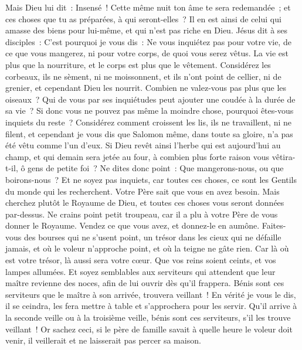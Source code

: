 \begin{multicols}{2}
Mais Dieu lui dit~: Insensé~! Cette même nuit ton âme te sera redemandée~; et ces choses que tu as préparées, à qui seront-elles~?
Il en est ainsi de celui qui amasse des biens pour lui-même, et qui n'est pas riche en Dieu.
Jésus dit à ses disciples~: C'est pourquoi je vous dis~: Ne vous inquiétez pas pour votre vie, de ce que vous mangerez, ni pour votre corps, de quoi vous serez vêtus.
La vie est plus que la nourriture, et le corps est plus que le vêtement.
Considérez les corbeaux, ils ne sèment, ni ne moissonnent, et ils n'ont point de cellier, ni de grenier, et cependant Dieu les nourrit. Combien ne valez-vous pas plus que les oiseaux~?
Qui de vous par ses inquiétudes peut ajouter une coudée à la durée de sa vie~?
Si donc vous ne pouvez pas même la moindre chose, pourquoi êtes-vous inquiets du reste~?
Considérez comment croissent les lis, ils ne travaillent, ni ne filent, et cependant je vous dis que Salomon même, dans toute sa gloire, n'a pas été vêtu comme l'un d'eux.
Si Dieu revêt ainsi l'herbe qui est aujourd'hui au champ, et qui demain sera jetée au four, à combien plus forte raison vous vêtira-t-il, ô gens de petite foi~?
Ne dites donc point~: Que mangerons-nous, ou que boirons-nous~? Et ne soyez pas inquiets,
car toutes ces choses, ce sont les Gentils du monde qui les recherchent. Votre Père sait que vous en avez besoin.
Mais cherchez plutôt le Royaume de Dieu, et toutes ces choses vous seront données par-dessus.
Ne crains point petit troupeau, car il a plu à votre Père de vous donner le Royaume.
Vendez ce que vous avez, et donnez-le en aumône. Faites-vous des bourses qui ne s'usent point, un trésor dans les cieux qui ne défaille jamais, et où le voleur n'approche point, et où la teigne ne gâte rien.
Car là où est votre trésor, là aussi sera votre cœur.
Que vos reins soient ceints, et vos lampes allumées.
Et soyez semblables aux serviteurs qui attendent que leur maître revienne des noces, afin de lui ouvrir dès qu'il frappera.
Bénis sont ces serviteurs que le maître à son arrivée, trouvera veillant~! En vérité je vous le dis, il se ceindra, les fera mettre à table et s'approchera pour les servir.
Qu'il arrive à la seconde veille ou à la troisième veille, bénis sont ces serviteurs, s'il les trouve veillant~!
Or sachez ceci, si le père de famille savait à quelle heure le voleur doit venir, il veillerait et ne laisserait pas percer sa maison.

\end{multicols}
